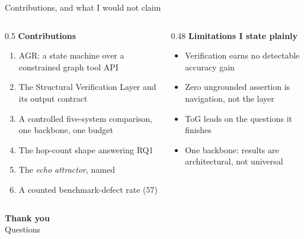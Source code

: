 \documentclass[aspectratio=169,12pt]{beamer}
\begin{document}
\begin{frame}{Contributions, and what I would not claim}
  \begin{columns}[T]
    \begin{column}{0.5\textwidth}
      \textbf{Contributions}
      \small
      \begin{enumerate}
        \item AGR: a state machine over a constrained graph tool API
        \item The Structural Verification Layer and its output contract
        \item A controlled five-system comparison, one backbone, one budget
        \item The hop-count shape answering RQ1
        \item The \emph{echo attractor}, named
        \item A counted benchmark-defect rate ($57$)
      \end{enumerate}
    \end{column}
    \begin{column}{0.48\textwidth}
      \textbf{Limitations I state plainly}
      \small
      \begin{itemize}
        \item Verification earns \alert{no} detectable accuracy gain
        \item Zero ungrounded assertion is \alert{navigation}, not the layer
        \item ToG leads on the questions it finishes
        \item One backbone: results are architectural, not universal
      \end{itemize}
    \end{column}
  \end{columns}
\end{frame}

{
\begin{frame}[plain]
  \vfill
  \centering
  {\Large\bfseries\color{agrdark} Thank you}\\[4mm]
  {\large Questions}
  \vfill
\end{frame}}
\end{document}
